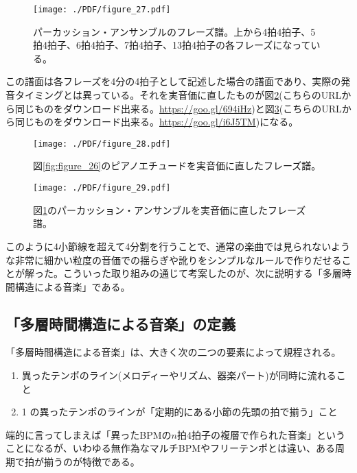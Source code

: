 \documentclass[uplatex,dvipdfmx]{ujarticle}
\begin{document}
\begin{figure}[ht]
\centerline{
	\texttt{[image: ./PDF/figure\_27.pdf]}
}
\caption{パーカッション・アンサンブルのフレーズ譜。上から4拍4拍子、5拍4拍子、6拍4拍子、7拍4拍子、13拍4拍子の各フレーズになっている。}
\label{fig:figure_27}
\end{figure}

この譜面は各フレーズを4分の4拍子として記述した場合の譜面であり、実際の発音タイミングとは異っている。それを実音価に直したものが図\ref{fig:figure_28}(こちらのURLから同じものをダウンロード出来る。\url{https://goo.gl/694iHz})と図\ref{fig:figure_29}(こちらのURLから同じものをダウンロード出来る。\url{https://goo.gl/i6J5TM})になる。

\begin{figure}[ht]
\centerline{
	\texttt{[image: ./PDF/figure\_28.pdf]}
}
\caption{図\ref{fig:figure_26}のピアノエチュードを実音価に直したフレーズ譜。}
\label{fig:figure_28}
\end{figure}

\begin{figure}[ht]
\centerline{
	\texttt{[image: ./PDF/figure\_29.pdf]}
}
\caption{図\ref{fig:figure_27}のパーカッション・アンサンブルを実音価に直したフレーズ譜。}
\label{fig:figure_29}
\end{figure}

このように4小節線を超えて4分割を行うことで、通常の楽曲では見られないような非常に細かい粒度の音価での揺らぎや訛りをシンプルなルールで作りだせることが解った。こういった取り組みの通じて考案したのが、次に説明する「多層時間構造による音楽」である。

\afterpage{\clearpage}
\newpage

\subsection{「多層時間構造による音楽」の定義}

「多層時間構造による音楽」は、大きく次の二つの要素によって規程される。

\begin{enumerate}
  \item 異ったテンポのライン(メロディーやリズム、器楽パート)が同時に流れること
  \item 1 の異ったテンポのラインが「定期的にある小節の先頭の拍で揃う」こと
\end{enumerate}

端的に言ってしまえば「異ったBPMの$ n $拍4拍子の複層で作られた音楽」ということになるが、いわゆる無作為なマルチBPMやフリーテンポとは違い、ある周期で拍が揃うのが特徴である。
\end{document}
